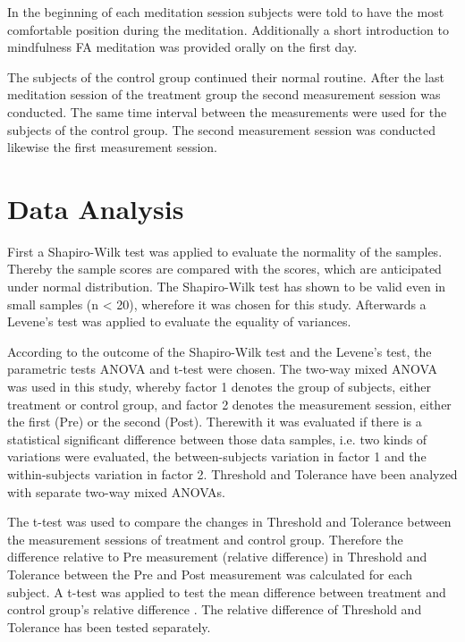 In the beginning of each meditation session subjects were told to have the most comfortable position during the meditation.  Additionally a short introduction to mindfulness FA meditation was provided orally on the first day. 

The subjects of the control group continued their normal routine.
After the last meditation session of the treatment group the second measurement session was conducted. The same time interval between the measurements were used for the subjects of the control group. The second measurement session was conducted likewise the first measurement session.


\section{Data Analysis}
First a Shapiro-Wilk test was applied to evaluate the normality of the samples. Thereby the sample scores are compared with the scores, which are anticipated under normal distribution. The Shapiro-Wilk test has shown to be valid even in small samples (n < 20), wherefore it was chosen for this study. \cite{Shapiro1965,Mooi2018} Afterwards a Levene’s test was applied to evaluate the equality of variances.

According to the outcome of the Shapiro-Wilk test and the Levene’s test, the parametric tests ANOVA and t-test were chosen.
The two-way mixed ANOVA was used in this study, whereby factor 1 denotes the group of subjects, either treatment or control group, and factor 2 denotes the measurement session, either the first (Pre) or the second (Post). Therewith it was evaluated if there is a statistical significant difference between those data samples, i.e. 
two kinds of variations were evaluated, the between-subjects variation in factor 1 and the within-subjects variation in factor 2. 
Threshold and Tolerance have been analyzed with separate two-way mixed ANOVAs. \cite{Mooi2018}

The t-test was used to compare the changes in Threshold and Tolerance between the measurement sessions of treatment and control group. Therefore the difference relative to Pre measurement (relative difference) in Threshold and Tolerance between the Pre and Post measurement was calculated for each subject. A t-test was applied to test the mean difference between treatment and control group’s relative difference \cite{Mooi2018}. The relative difference of Threshold and Tolerance has been tested separately. 


